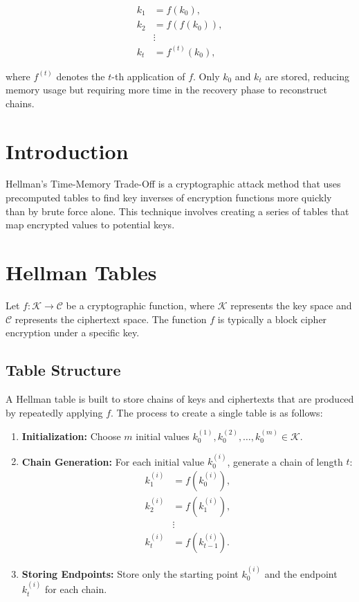 \begin{align*}
	k_1 &= f(k_0), \\
	k_2 &= f(f(k_0)), \\
	&\vdots \\
	k_t &= f^{(t)}(k_0),
\end{align*}

where $f^{(t)}$ denotes the $t$-th application of $f$. Only $k_0$ and $k_t$ are stored, reducing memory usage but requiring more time in the recovery phase to reconstruct chains.

\newpage
\section*{Introduction}

Hellman's Time-Memory Trade-Off is a cryptographic attack method that uses precomputed tables to find key inverses of encryption functions more quickly than by brute force alone. This technique involves creating a series of tables that map encrypted values to potential keys.

\section*{Hellman Tables}

Let $f: \mathcal{K} \rightarrow \mathcal{C}$ be a cryptographic function, where $\mathcal{K}$ represents the key space and $\mathcal{C}$ represents the ciphertext space. The function $f$ is typically a block cipher encryption under a specific key.

\subsection*{Table Structure}

A Hellman table is built to store chains of keys and ciphertexts that are produced by repeatedly applying $f$. The process to create a single table is as follows:

\begin{enumerate}
	\item \textbf{Initialization:} Choose $m$ initial values $k_0^{(1)}, k_0^{(2)}, \dots, k_0^{(m)} \in \mathcal{K}$.
	\item \textbf{Chain Generation:} For each initial value $k_0^{(i)}$, generate a chain of length $t$:
	\begin{align*}
		k_1^{(i)} &= f(k_0^{(i)}), \\
		k_2^{(i)} &= f(k_1^{(i)}), \\
		&\vdots \\
		k_t^{(i)} &= f(k_{t-1}^{(i)}).
	\end{align*}
	\item \textbf{Storing Endpoints:} Store only the starting point $k_0^{(i)}$ and the endpoint $k_t^{(i)}$ for each chain.
\end{enumerate}

